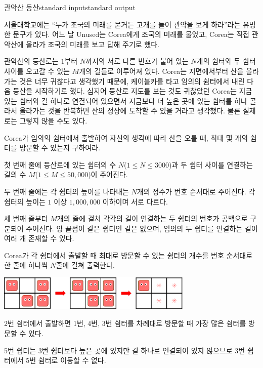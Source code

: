 \begin{problem}{관악산 등산}{standard input}{standard output}

서울대학교에는 ``누가 조국의 미래를 묻거든 고개를 들어 관악을 보게 하라''라는 유명한 문구가 있다. 어느 날 Unused는 Corea에게 조국의 미래를 물었고, Corea는 직접 관악산에 올라가 조국의 미래를 보고 답해 주기로 했다.

관악산의 등산로는 $1$부터 $N$까지의 서로 다른 번호가 붙어 있는 $N$개의 쉼터와 두 쉼터 사이를 오고갈 수 있는 $M$개의 길들로 이루어져 있다. Corea는 지면에서부터 산을 올라가는 것은 너무 귀찮다고 생각했기 때문에, 케이블카를 타고 임의의 쉼터에서 내린 다음 등산을 시작하기로 했다. 심지어 등산로 지도를 보는 것도 귀찮았던 Corea는 지금 있는 쉼터와 길 하나로 연결되어 있으면서 지금보다 더 높은 곳에 있는 쉼터를 하나 골라서 올라가는 것을 반복하면 산의 정상에 도착할 수 있을 거라고 생각했다. 물론 실제로는 그렇지 않을 수도 있다.

Corea가 임의의 쉼터에서 출발하여 자신의 생각에 따라 산을 오를 때, 최대 몇 개의 쉼터를 방문할 수 있는지 구하여라.

\InputFile
첫 번째 줄에 등산로에 있는 쉼터의 수 $N$($1 \le N \le 3000$)과 두 쉼터 사이를 연결하는 길의 수 $M$($1 \le M \le 50,000$)이 주어진다.

두 번째 줄에는 각 쉼터의 높이를 나타내는 $N$개의 정수가 번호 순서대로 주어진다. 각 쉼터의 높이는 $1$ 이상 $1,000,000$ 이하이며 서로 다르다.

세 번째 줄부터 $M$개의 줄에 걸쳐 각각의 길이 연결하는 두 쉼터의 번호가 공백으로 구분되어 주어진다. 양 끝점이 같은 쉼터인 길은 없으며, 임의의 두 쉼터를 연결하는 길이 여러 개 존재할 수 있다.

\OutputFile
Corea가 각 쉼터에서 출발할 때 최대로 방문할 수 있는 쉼터의 개수를 번호 순서대로 한 줄에 하나씩 $N$줄에 걸쳐 출력한다.

\Example

\begin{example}
%
\end{example}

\Notes
\begin{center}
  \includegraphics[width=0.7\textwidth]{nemo.png}
\end{center}

2번 쉼터에서 출발하면 1번, 4번, 3번 쉼터를 차례대로 방문할 때 가장 많은 쉼터를 방문할 수 있다.

5번 쉼터는 3번 쉼터보다 높은 곳에 있지만 길 하나로 연결되어 있지 않으므로 3번 쉼터에서 5번 쉼터로 이동할 수 없다.

\end{problem}
